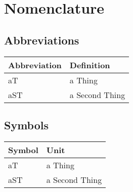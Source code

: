 \chapter*{Nomenclature}

\section*{Abbreviations}

\begin{table}[h]

\label{NOMENCLATURE}

\begin{tabular}{ll}

	\hline

	\textbf{Abbreviation} & \textbf{Definition}	\\ \hline

	aT          	& a Thing  			\\

	aST		& a Second Thing 		\\ \hline

\end{tabular}

\end{table}
\section*{Symbols}


\begin{tabular}{ll}

	\hline

	\textbf{Symbol} & \textbf{Unit}	\\ \hline

	aT          	& a Thing  			\\

	aST		& a Second Thing 		\\ \hline

\end{tabular}